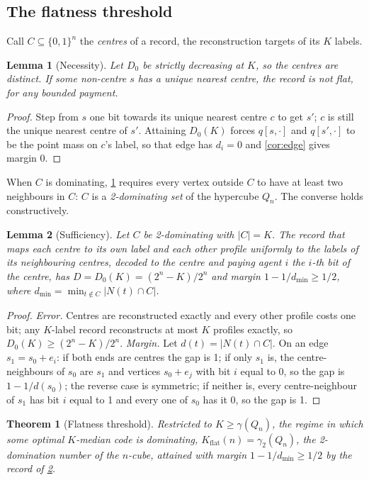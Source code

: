 \documentclass[sigconf,anonymous,acmthm=false]{acmart}
\theoremstyle{acmplain}
\newtheorem{theorem}{Theorem}
\newtheorem{lemma}{Lemma}
\theoremstyle{acmdefinition}
\newcommand{\Kflat}{K_{\mathrm{flat}}}
\newcommand{\dmin}{d_{\min}}
\newcommand{\cube}{\{0,1\}}
\begin{document}
\subsection{The flatness threshold}\label{sec:flat}

Call $C\subseteq\cube^n$ the \emph{centres} of a record, the reconstruction targets of its
$K$ labels.

\begin{lemma}[Necessity]\label{lem:nec}
Let $D_0$ be strictly decreasing at $K$, so the centres are distinct. If some non-centre $s$
has a unique nearest centre, the record is not flat, for any bounded payment.
\end{lemma}
\begin{proof}
Step from $s$ one bit towards its unique nearest centre $c$ to get $s'$; $c$ is still the
unique nearest centre of $s'$. Attaining $D_0(K)$ forces $q[s,\cdot]$ and $q[s',\cdot]$ to be
the point mass on $c$'s label, so that edge has $d_i=0$ and \cref{cor:edge} gives margin 0.
\end{proof}

When $C$ is dominating, \cref{lem:nec} requires every vertex outside $C$ to have at least two
neighbours in $C$: $C$ is a \emph{2-dominating set} of the hypercube $Q_n$. The converse holds
constructively.

\begin{lemma}[Sufficiency]\label{lem:suff}
Let $C$ be 2-dominating with $|C|=K$. The record that maps each centre to its own label and
each other profile uniformly to the labels of its neighbouring centres, decoded to the centre
and paying agent $i$ the $i$-th bit of the centre, has $D=D_0(K)=(2^n-K)/2^n$ and margin
$1-1/\dmin\ge1/2$, where $\dmin=\min_{t\notin C}|N(t)\cap C|$.
\end{lemma}
\begin{proof}
\emph{Error.} Centres are reconstructed exactly and every other profile costs one bit; any
$K$-label record reconstructs at most $K$ profiles exactly, so $D_0(K)\ge(2^n-K)/2^n$.
\emph{Margin.} Let $d(t)=|N(t)\cap C|$. On an edge $s_1=s_0+e_i$: if both ends are centres the
gap is 1; if only $s_1$ is, the centre-neighbours of $s_0$ are $s_1$ and vertices $s_0+e_j$
with bit $i$ equal to 0, so the gap is $1-1/d(s_0)$; the reverse case is symmetric; if
neither is, every centre-neighbour of $s_1$ has bit $i$ equal to 1 and every one of $s_0$ has
it 0, so the gap is 1.
\end{proof}

\begin{theorem}[Flatness threshold]\label{thm:flat}
Restricted to $K\ge\gamma(Q_n)$, the regime in which some optimal $K$-median code is
dominating, $\Kflat(n)=\gamma_2(Q_n)$, the 2-domination number of the $n$-cube, attained with
margin $1-1/\dmin\ge1/2$ by the record of \cref{lem:suff}.
\end{theorem}
\end{document}
